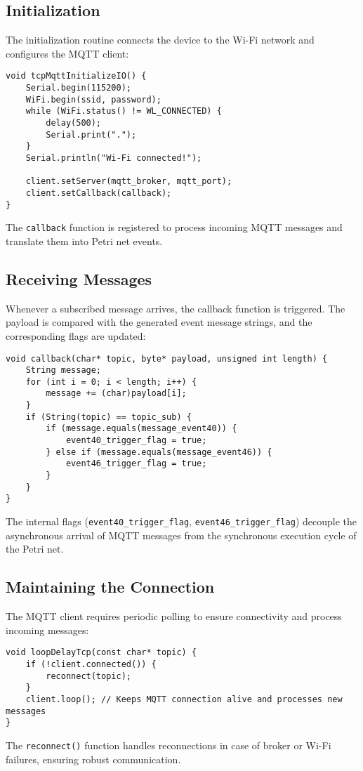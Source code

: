 \subsection{Initialization}
The initialization routine connects the device to the Wi-Fi network and configures the MQTT client:
\begin{verbatim}
void tcpMqttInitializeIO() {
    Serial.begin(115200);
    WiFi.begin(ssid, password);
    while (WiFi.status() != WL_CONNECTED) {
        delay(500);
        Serial.print(".");
    }
    Serial.println("Wi-Fi connected!");

    client.setServer(mqtt_broker, mqtt_port);
    client.setCallback(callback);
}
\end{verbatim}
The \texttt{callback} function is registered to process incoming MQTT messages and translate them into Petri net events.

\subsection{Receiving Messages}
Whenever a subscribed message arrives, the callback function is triggered. The payload is compared with the generated event message strings, and the corresponding flags are updated:
\begin{verbatim}
void callback(char* topic, byte* payload, unsigned int length) {
    String message;
    for (int i = 0; i < length; i++) {
        message += (char)payload[i];
    }
    if (String(topic) == topic_sub) {
        if (message.equals(message_event40)) {
            event40_trigger_flag = true;
        } else if (message.equals(message_event46)) {
            event46_trigger_flag = true;
        }
    }
}
\end{verbatim}
The internal flags (\texttt{event40\_trigger\_flag}, \texttt{event46\_trigger\_flag}) decouple the asynchronous arrival of MQTT messages from the synchronous execution cycle of the Petri net.

\subsection{Maintaining the Connection}
The MQTT client requires periodic polling to ensure connectivity and process incoming messages:
\begin{verbatim}
void loopDelayTcp(const char* topic) {
    if (!client.connected()) {
        reconnect(topic);
    }
    client.loop(); // Keeps MQTT connection alive and processes new messages
}
\end{verbatim}
The \texttt{reconnect()} function handles reconnections in case of broker or Wi-Fi failures, ensuring robust communication.

